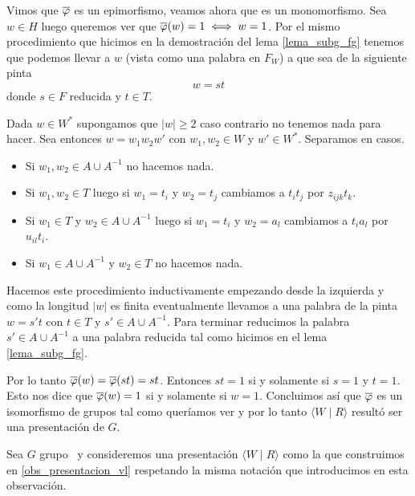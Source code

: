 \documentclass[tesis.tex]{subfiles}
\begin{document}
\begin{obs}
	Vimos que $\overline \varphi$ es un epimorfismo, veamos ahora que es un monomorfismo.
	Sea $w \in H$ luego queremos ver que $\overline \varphi(w) = 1 \iff w = 1$.
	Por el mismo procedimiento que hicimos en la demostración del lema \ref{lema_subg_fg} 
	tenemos que podemos llevar a $w$ (vista como una palabra en $F_{W}$) a que sea de la siguiente pinta
	\[
		w = st
	\]
	donde $s \in F$ reducida y $t \in T$.
	
	Dada $w \in W^*$ supongamos que $|w| \ge 2$ caso contrario no tenemos nada para hacer.
	Sea entonces $w = w_{1}w_{2}w'$ con $w_{1}, w_{2} \in W$ y $w' \in W^*$.
	Separamos en casos.
	\begin{itemize}
		\item Si $w_{1}, w_{2} \in A \cup A^{-1}$ no hacemos nada.
		\item Si $w_{1}, w_{2} \in T$ luego si $w_{1} = t_{i}$ y $w_{2} = t_{j}$ cambiamos a $t_{i}t_{j}$ por $z_{ijk}t_{k}$.
		\item Si $w_{1}\in T$ y $ w_{2} \in A \cup A^{-1}$ luego si $w_{1} = t_{i}$ y $w_{2} = a_{l}$ cambiamos a $t_{i}a_{l}$ por $u_{il}t_{i}$.
		\item Si $ w_{1} \in A \cup A^{-1}$ y $w_{2} \in T$ no hacemos nada.
	\end{itemize}
	Hacemos este procedimiento inductivamente empezando desde la izquierda y como la longitud $|w|$ es finita eventualmente llevamos a una palabra de la pinta $w = s't$ con $t \in T$ y $s' \in A \cup A^{-1}$.
	Para terminar reducimos la palabra $s' \in A \cup A^{-1}$ a una palabra reducida tal como hicimos en el lema \ref{lema_subg_fg}.
	
	
	
	
	Por lo tanto $\overline \varphi (w) = \overline \varphi(st) = st$.
	Entonces $st = 1$ si y solamente si $s=1$ y $t=1$. 
	Esto nos dice que $\overline \varphi(w) = 1$ si y solamente si $w=1$. 
	Concluimos así que $\overline \varphi$ es un isomorfismo de grupos tal como queríamos ver y por lo tanto  $\langle W \mid R \rangle$ resultó ser una presentación de $G$.
\end{obs}
	\medskip
	Sea $G$ grupo \vl  \ y consideremos una presentación $\langle W  \mid  R \rangle$ como la que construimos en \ref{obs_presentacion_vl} respetando la misma notación que introducimos en esta observación.
	
\end{document}
